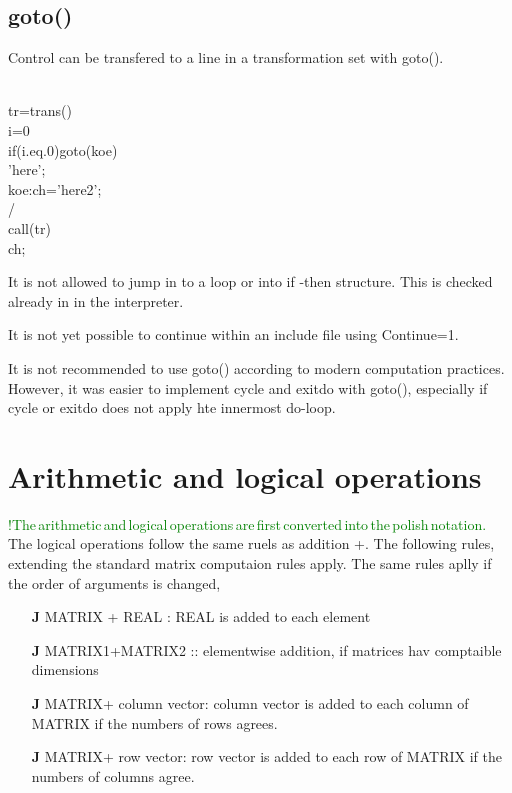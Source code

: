 \begin{itemize}
\subsection{\textcolor{VioletRed}{goto}()}
\label{goto}
Control can be transfered to a line in a transformation set with \textcolor{VioletRed}{goto}().
\begin{example}[gotoex]\\
\label{gotoex}
tr=\textcolor{VioletRed}{trans}()\\
i=0\\
\textcolor{VioletRed}{if}(i.eq.0)\textcolor{VioletRed}{goto}(koe)\\
'here';\\
koe:ch='here2';\\
/\\
\textcolor{VioletRed}{call}(tr)\\
ch;

\end{example}

\begin{note}
It is not allowed to jump in to a loop or into if -then structure. This is
checked already in in the interpreter.
\end{note}
\begin{note}
It is not yet possible to continue within an include file using Continue=1.
\end{note}
\begin{note}
It is not recommended to use \textcolor{VioletRed}{goto}() according to modern computation practices.
However, it was easier to implement cycle and exitdo with \textcolor{VioletRed}{goto}(), especially if
cycle or exitdo does not apply hte innermost do-loop.
\end{note}
\section{Arithmetic and logical operations}
\label{arit}
\textcolor{green}{!The\,arithmetic\,and\,logical\,operations\,are\,first\,converted\,into\,the\,polish\,notation.}
The logical operations follow the same ruels as addition +. The following rules,
extending the standard matrix computaion rules apply. The same rules aplly if the
order of arguments is changed,
\begin{itemize}
\item[\textbf{J}] MATRIX + REAL : REAL is added to each element

\item[\textbf{J}] MATRIX1+MATRIX2 :: elementwise addition, if matrices hav comptaible dimensions
\item[\textbf{J}]  MATRIX+ column vector: column vector is added to each column of MATRIX
if the numbers of rows agrees.
\item[\textbf{J}]  MATRIX+ row vector: row vector is added to each
row of MATRIX
if the numbers of columns agree.


\end{itemize}
\end{itemize}
